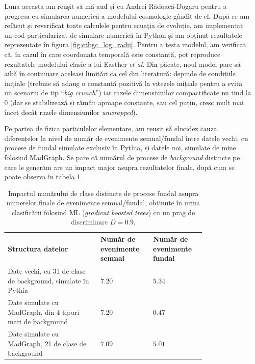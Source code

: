 Luna aceasta am reușit să mă aud și cu Andrei Rădoacă-Dogaru pentru a progresa cu simularea numerică a modelului cosmologic gândit de el. După ce am refăcut și reverificat toate calculele pentru ecuația de evoluție, am implementat un cod particularizat de simulare numerică în Python și am obținut rezultatele reprezentate în figura \ref{fig:ctbgc_log_radii}. Pentru a testa modelul, am verificat că, în cazul în care coordonata temporală este constantă, pot reproduce rezultatele modelului clasic a lui Easther \emph{et al.} Din păcate, noul model pare să aibă în continuare aceleași limitări ca cel din literatură: depinde de condițiile inițiale (trebuie să adaug o constantă pozitivă la vitezele inițiale pentru a evita un scenariu de tip ``\textit{big crunch}'') iar razele dimensiunilor compactificate nu tind la \(0\) (dar se stabilizează și rămân aproape constante, sau cel puțin, cresc mult mai încet decât razele dimensiunilor \textit{unwrapped}).

Pe partea de fizica particulelor elementare, am reușit să elucidez cauza diferențelor la nivel de număr de evenimente semnal/fundal între datele vechi, cu procese de fundal simulate exclusiv în Pythia, și datele noi, simulate de mine folosind MadGraph. Se pare că numărul de procese de \textit{background} distincte pe care le generăm are un impact major asupra rezultatelor finale, după cum se poate observa în tabela \ref{tab:number_of_backgrounds_impact}.

\begin{table}[htbp]
    \centering
    \begin{tabular}{|p{0.4\linewidth} | p{0.2\linewidth} | p{0.2\linewidth} |}
        \hline
        \centering
        Structura datelor & Număr de evenimente semnal & Număr de evenimente fundal \\
        \hline \hline
        Date vechi, cu 31 de clase de background, simulate în Pythia & \(7.20\) & \(5.34\) \\
        \hline
        Date simulate cu MadGraph, din 4 tipuri mari de background & \(7.20\) & \(0.47\) \\
        \hline
        Date simulate cu MadGraph, 21 de clase de background & \(7.09\) & \(5.01\) \\
        \hline
    \end{tabular}
    \caption{Impactul numărului de clase distincte de procese fundal asupra numerelor finale de evenimente semnal/fundal, obținute în urma clasificării folosind ML (\textit{gradient boosted trees}) cu un prag de discriminare \(D = 0.9\).}
    \label{tab:number_of_backgrounds_impact}
\end{table}

